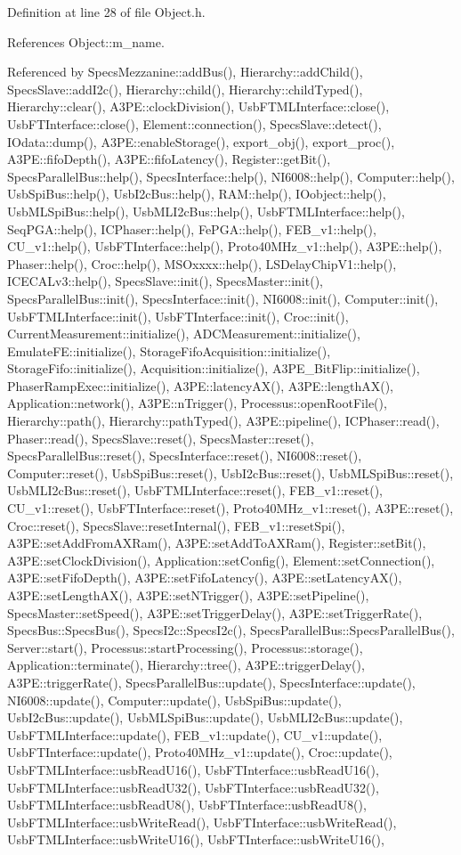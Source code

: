 Definition at line 28 of file Object.h.

References Object::m\_\-name.

Referenced by SpecsMezzanine::addBus(), Hierarchy::addChild(), SpecsSlave::addI2c(), Hierarchy::child(), Hierarchy::childTyped(), Hierarchy::clear(), A3PE::clockDivision(), UsbFTMLInterface::close(), UsbFTInterface::close(), Element::connection(), SpecsSlave::detect(), IOdata::dump(), A3PE::enableStorage(), export\_\-obj(), export\_\-proc(), A3PE::fifoDepth(), A3PE::fifoLatency(), Register::getBit(), SpecsParallelBus::help(), SpecsInterface::help(), NI6008::help(), Computer::help(), UsbSpiBus::help(), UsbI2cBus::help(), RAM::help(), IOobject::help(), UsbMLSpiBus::help(), UsbMLI2cBus::help(), UsbFTMLInterface::help(), SeqPGA::help(), ICPhaser::help(), FePGA::help(), FEB\_\-v1::help(), CU\_\-v1::help(), UsbFTInterface::help(), Proto40MHz\_\-v1::help(), A3PE::help(), Phaser::help(), Croc::help(), MSOxxxx::help(), LSDelayChipV1::help(), ICECALv3::help(), SpecsSlave::init(), SpecsMaster::init(), SpecsParallelBus::init(), SpecsInterface::init(), NI6008::init(), Computer::init(), UsbFTMLInterface::init(), UsbFTInterface::init(), Croc::init(), CurrentMeasurement::initialize(), ADCMeasurement::initialize(), EmulateFE::initialize(), StorageFifoAcquisition::initialize(), StorageFifo::initialize(), Acquisition::initialize(), A3PE\_\-BitFlip::initialize(), PhaserRampExec::initialize(), A3PE::latencyAX(), A3PE::lengthAX(), Application::network(), A3PE::nTrigger(), Processus::openRootFile(), Hierarchy::path(), Hierarchy::pathTyped(), A3PE::pipeline(), ICPhaser::read(), Phaser::read(), SpecsSlave::reset(), SpecsMaster::reset(), SpecsParallelBus::reset(), SpecsInterface::reset(), NI6008::reset(), Computer::reset(), UsbSpiBus::reset(), UsbI2cBus::reset(), UsbMLSpiBus::reset(), UsbMLI2cBus::reset(), UsbFTMLInterface::reset(), FEB\_\-v1::reset(), CU\_\-v1::reset(), UsbFTInterface::reset(), Proto40MHz\_\-v1::reset(), A3PE::reset(), Croc::reset(), SpecsSlave::resetInternal(), FEB\_\-v1::resetSpi(), A3PE::setAddFromAXRam(), A3PE::setAddToAXRam(), Register::setBit(), A3PE::setClockDivision(), Application::setConfig(), Element::setConnection(), A3PE::setFifoDepth(), A3PE::setFifoLatency(), A3PE::setLatencyAX(), A3PE::setLengthAX(), A3PE::setNTrigger(), A3PE::setPipeline(), SpecsMaster::setSpeed(), A3PE::setTriggerDelay(), A3PE::setTriggerRate(), SpecsBus::SpecsBus(), SpecsI2c::SpecsI2c(), SpecsParallelBus::SpecsParallelBus(), Server::start(), Processus::startProcessing(), Processus::storage(), Application::terminate(), Hierarchy::tree(), A3PE::triggerDelay(), A3PE::triggerRate(), SpecsParallelBus::update(), SpecsInterface::update(), NI6008::update(), Computer::update(), UsbSpiBus::update(), UsbI2cBus::update(), UsbMLSpiBus::update(), UsbMLI2cBus::update(), UsbFTMLInterface::update(), FEB\_\-v1::update(), CU\_\-v1::update(), UsbFTInterface::update(), Proto40MHz\_\-v1::update(), Croc::update(), UsbFTMLInterface::usbReadU16(), UsbFTInterface::usbReadU16(), UsbFTMLInterface::usbReadU32(), UsbFTInterface::usbReadU32(), UsbFTMLInterface::usbReadU8(), UsbFTInterface::usbReadU8(), UsbFTMLInterface::usbWriteRead(), UsbFTInterface::usbWriteRead(), UsbFTMLInterface::usbWriteU16(), UsbFTInterface::usbWriteU16(), 
